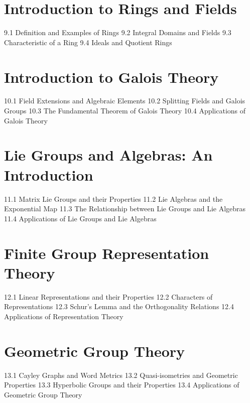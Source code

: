 \section{Introduction to Rings and Fields}
9.1 Definition and Examples of Rings
9.2 Integral Domains and Fields
9.3 Characteristic of a Ring
9.4 Ideals and Quotient Rings
\section{Introduction to Galois Theory}
10.1 Field Extensions and Algebraic Elements
10.2 Splitting Fields and Galois Groups
10.3 The Fundamental Theorem of Galois Theory
10.4 Applications of Galois Theory
\section{Lie Groups and Algebras: An Introduction}
11.1 Matrix Lie Groups and their Properties
11.2 Lie Algebras and the Exponential Map
11.3 The Relationship between Lie Groups and Lie Algebras
11.4 Applications of Lie Groups and Lie Algebras
\section{Finite Group Representation Theory}
12.1 Linear Representations and their Properties
12.2 Characters of Representations
12.3 Schur's Lemma and the Orthogonality Relations
12.4 Applications of Representation Theory
\section{Geometric Group Theory}
13.1 Cayley Graphs and Word Metrics
13.2 Quasi-isometries and Geometric Properties
13.3 Hyperbolic Groups and their Properties
13.4 Applications of Geometric Group Theory
